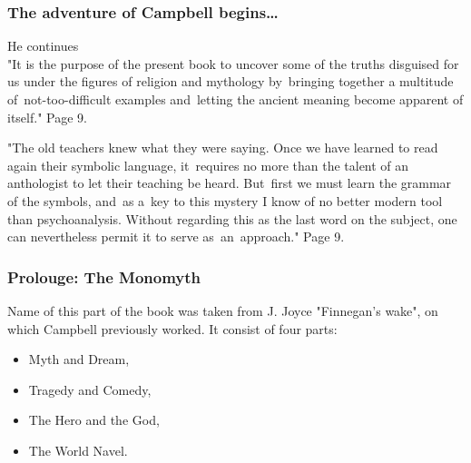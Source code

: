 \documentclass[10pt,t]{beamer}
\begin{document}
\begin{frame}
  \frametitle{The adventure of Campbell begins\ldots}


  He continues \\
  "It is the purpose of the present book to uncover some of the
  truths disguised for us under the figures of religion and
  mythology by~bringing together a multitude of~not-too-difficult
  examples and~letting the ancient meaning become apparent of
  itself." Page 9.

  "The old teachers knew what they were saying. Once we have learned
  to read again their symbolic language, it~requires no more than
  the talent of an anthologist to let their teaching be heard.
  But~first we must learn the grammar of the symbols, and~as a~key
  to this mystery I know of no better modern tool than
  psychoanalysis. Without regarding this as the last word on the
  subject, one can nevertheless permit it to serve as~an~approach."
  Page 9.

\end{frame}





\begin{frame}
  \frametitle{Prolouge: The Monomyth}


  Name of this part of the book was taken from J. Joyce "Finnegan's
  wake", on which Campbell previously worked. It consist of four
  parts:
  \begin{itemize}
    \RaggedRight

  \item Myth and Dream,

  \item Tragedy and Comedy,

  \item The Hero and the God,

  \item The World Navel.

  \end{itemize}

\end{frame}
\end{document}
